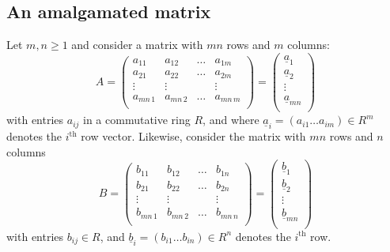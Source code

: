 \documentclass[10pt]{amsart}
\theoremstyle{definition}
\theoremstyle{remark}
\numberwithin{equation}{section}
\newcommand{\0}{\color{blue}{\mathsf{0}}}
\begin{document}
\subsection{An amalgamated matrix}
Let $m,n\geq 1$ and consider a  matrix with $mn$ rows and $m$ columns:
\begin{equation} \label{matrixAdef} A=   \begin{pmatrix}  a_{11} & a_{12} &  \ldots & a_{1m} \\ 
a_{21} & a_{22} &  \ldots & a_{2m} \\ 
 \vdots    &   \vdots&  & \vdots \\
a_{mn\, 1 } & a_{mn \, 2} &  \ldots & a_{mn \, m} \\ 
 \end{pmatrix}  = 
 \begin{pmatrix}  \underline{a}_1 \\ 
 \underline{a}_2 \\ 
      \vdots \\
\underline{a}_{mn} \\ 
 \end{pmatrix}    
 \end{equation} 
 with entries $a_{i  j}$ in a commutative ring $R$, and where $\underline{a}_i = (a_{i 1} \ldots a_{i  m} ) \in R^m$ denotes the $i^{\mathrm{th}}$ row vector.
 Likewise, consider the matrix with  $mn$ rows and $n$ columns 
\begin{equation} \label{matrixBdef}    B=   \begin{pmatrix}  b_{11} & b_{12} &  \ldots & b_{1 n } \\ 
b_{21} & b_{22} &  \ldots & b_{2 n } \\ 
 \vdots    &  \vdots &  & \vdots \\
b_{mn\, 1 } & b_{mn \, 2} &  \ldots & b_{mn \,  n } \\ 
 \end{pmatrix} =  \begin{pmatrix}   \underline{b}_1 \\ 
 \underline{b}_2 \\ 
      \vdots \\
\underline{b}_{mn} \\ 
 \end{pmatrix}     \end{equation}
 with entries $b_{ij}\in R$, and  $\underline{b}_i = (b_{i  1} \ldots b_{i  n} ) \in R^n$ denotes the $i^{\mathrm{th}}$ row.
  
\end{document}
